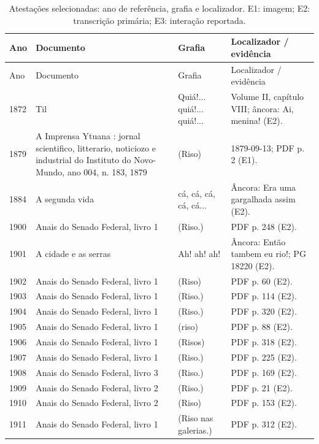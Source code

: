 \small
\begin{longtable}{p{}p{}p{}p{}}
\caption{Atestações selecionadas: ano de referência, grafia e localizador. E1: imagem; E2: transcrição primária; E3: interação reportada.}\label{tab:attestations}\\
\toprule Ano & Documento & Grafia & Localizador / evidência \\\midrule\endfirsthead
\toprule Ano & Documento & Grafia & Localizador / evidência \\\midrule\endhead
1872 & Til \cite{alencar1872} & Quiá!... quiá!... quiá!... & Volume II, capítulo VIII; âncora: Ai, menina! (E2). \\
1879 & A Imprensa Ytuana : jornal scientifico, litterario, noticiozo e industrial do Instituto do Novo-Mundo, ano 004, n. 183, 1879 \cite{r3doc1} & (Riso) & 1879-09-13; PDF p. 2 (E1). \\
1884 & A segunda vida \cite{assis1884} & cá, cá, cá, cá, cá... & Âncora: Era uma gargalhada assim (E2). \\
1900 & Anais do Senado Federal, livro 1 \cite{anual1900} & (Riso.) & PDF p. 248 (E2). \\
1901 & A cidade e as serras \cite{queiros1901} & Ah! ah! ah! & Âncora: Então tambem eu rio!; PG 18220 (E2). \\
1902 & Anais do Senado Federal, livro 1 \cite{anual1902} & (Riso) & PDF p. 60 (E2). \\
1903 & Anais do Senado Federal, livro 1 \cite{anual1903} & (Riso.) & PDF p. 114 (E2). \\
1904 & Anais do Senado Federal, livro 1 \cite{anual1904} & (Riso.) & PDF p. 320 (E2). \\
1905 & Anais do Senado Federal, livro 1 \cite{anual1905} & (riso) & PDF p. 88 (E2). \\
1906 & Anais do Senado Federal, livro 1 \cite{anual1906} & (Risos) & PDF p. 318 (E2). \\
1907 & Anais do Senado Federal, livro 1 \cite{anual1907} & (Riso.) & PDF p. 225 (E2). \\
1908 & Anais do Senado Federal, livro 3 \cite{anual1908} & (Riso.) & PDF p. 169 (E2). \\
1909 & Anais do Senado Federal, livro 2 \cite{anual1909} & (Riso.) & PDF p. 21 (E2). \\
1910 & Anais do Senado Federal, livro 2 \cite{anual1910} & (Riso) & PDF p. 153 (E2). \\
1911 & Anais do Senado Federal, livro 1 \cite{anual1911} & (Riso nas galerias.) & PDF p. 312 (E2). \\

\end{longtable}
